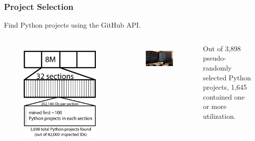\begin{frame}
\frametitle{Project Selection}
\begin{center}
Find Python projects using the GitHub API.
\end{center}
\begin{columns}[t]
\begin{figure}[ht]
  \includegraphics[scale=0.16]{../nontex/illustrations/32Divided.pdf}
  \label{fig:32Divided}
\end{figure}
\begin{figure}[ht]
  \includegraphics[width=\linewidth]{../nontex/smallScrapersPNG/smallScrapers-112}
    \label{fig:scraper}
\end{figure}
Out of 3,898 pseudo-randomly selected Python projects, 1,645 contained one or more utilization.
\end{columns}
\end{frame}
